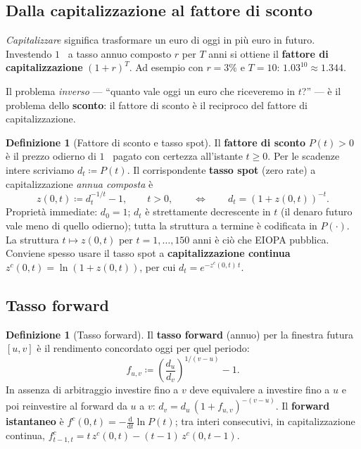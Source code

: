 \documentclass[11pt,a4paper]{article}
\theoremstyle{plain}
\theoremstyle{definition}
\newtheorem{definizione}[teorema]{Definizione}
\theoremstyle{remark}
\newcommand{\defeq}{\coloneqq}
\begin{document}
\subsection{Dalla capitalizzazione al fattore di sconto}

\emph{Capitalizzare} significa trasformare un euro di oggi in pi\`u euro in futuro. Investendo
$1$~\texteuro{} a tasso annuo composto $r$ per $T$ anni si ottiene il \textbf{fattore di
capitalizzazione} $(1+r)^T$. Ad esempio con $r=3\%$ e $T=10$: $1.03^{10}\approx 1.344$.

Il problema \emph{inverso} --- ``quanto vale oggi un euro che riceveremo in $t$?'' --- \`e il
problema dello \textbf{sconto}: il fattore di sconto \`e il reciproco del fattore di
capitalizzazione.

\begin{definizione}[Fattore di sconto e tasso spot]
\label{def:sconto}
Il \textbf{fattore di sconto} $P(t)>0$ \`e il prezzo odierno di $1$~\texteuro{} pagato con
certezza all'istante $t \ge 0$. Per le scadenze intere scriviamo $d_t \defeq P(t)$. Il
corrispondente \textbf{tasso spot} (zero rate) a capitalizzazione \emph{annua composta} \`e
\begin{equation}
  z(0,t) \defeq d_t^{-1/t} - 1, \qquad t>0,
  \qquad\Longleftrightarrow\qquad
  d_t = (1+z(0,t))^{-t}.
  \label{eq:spot-disc}
\end{equation}
Propriet\`a immediate: $d_0=1$; $d_t$ \`e strettamente decrescente in $t$ (il denaro futuro
vale meno di quello odierno); tutta la struttura a termine \`e codificata in $P(\cdot)$. La
struttura $t\mapsto z(0,t)$ per $t=1,\ldots,150$ anni \`e ci\`o che EIOPA pubblica. Conviene
spesso usare il tasso spot a \textbf{capitalizzazione continua} $z^c(0,t)=\ln(1+z(0,t))$, per
cui $d_t=e^{-z^c(0,t)\,t}$.
\end{definizione}

\subsection{Tasso forward}

\begin{definizione}[Tasso forward]
\label{def:forward}
Il \textbf{tasso forward} (annuo) per la finestra futura $[u,v]$ \`e il rendimento concordato
oggi per quel periodo:
\[
  f_{u,v} \defeq \left(\frac{d_u}{d_v}\right)^{1/(v-u)} - 1 .
\]
In assenza di arbitraggio investire fino a $v$ deve equivalere a investire fino a $u$ e poi
reinvestire al forward da $u$ a $v$: $d_v = d_u\,(1+f_{u,v})^{-(v-u)}$. Il \textbf{forward
istantaneo} \`e $f^c(0,t) = -\frac{\mathrm d}{\mathrm dt}\ln P(t)$; tra interi consecutivi, in
capitalizzazione continua, $f^c_{t-1,t} = t\,z^c(0,t) - (t-1)\,z^c(0,t-1)$.
\end{definizione}
\end{document}

